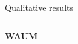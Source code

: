


\begin{frame}{Qualitative results}{}
    \begin{columns}
    \begin{column}{.3\textwidth}
        \textbf{WAUM}

        \vspace{.25cm}


\end{column}
\end{columns}
\end{frame}
